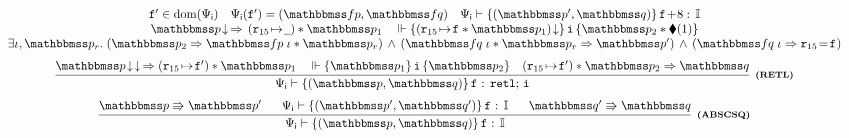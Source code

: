 \begin{figure*}
{\begin{minipage}{1\textwidth}
\[\begin{array}{c}
{                    }
                    {
                        \begin{array}{c}
                            \lab{}' \in \dom(\intSpec) \quad
                            \intSpec (\lab{}') = (\relspecpre, \relspecpost) \quad
                            \wdcblk{\intSpec}{\relastP'}
                                {\relastQ}{\lab{}\!+\!8}{\cblk} \\
                            \nxtAst{\relastP} \,\Rightarrow\,
                                (\regst{\reg{15}}{\notCare})
                                    * \relastP_1
                            \quad
                            \relwfins{\asrttm{(\regst{\reg{15}}{\lab{}} * \relastP_1)}}
                            {\simplins}{\relastP_2 \sepstar \metricAst{1}}  \\
                            \exists  \lgvl, \relastP_r. \;
                            \supimpl{\relastP_2}{\relastP'}
                                {\relspecpre \; \lgvl * \relastP_r}
                                {\relspecpost \; \lgvl * \relastP_r} \, \wedge \,
                            (\relspecpost \; \lgvl \Rightarrow \reg{15} \!=\! \lab{})
                        \end{array}	
                    } \\
                    \\[-5pt]
                    \infer[\tinybftext{(RETL)}]
                    {
                        \wdcblk{\intSpec}{\relastP}{\relastQ}{\lab{}}{\retl; \, \simplins}
                    }
                    {
                        \nxtAst{\nxtAst{\relastP}} \,\Rightarrow
                        (\regst\RAreg{\lab{}'}) \sepstar \relastP_1
                        \quad
                        \relwfins{\relastP_1}{\simplins}{\relastP_2}
                        \quad
                        (\regst\RAreg{\lab{}'}) \sepstar 
                                    \relastP_2 \Rightarrow \relastQ
                    } \\
                    \\[-5pt]
                    \infer[\tinybftext{(ABSCSQ)}]
                    {
                        \wdcblk{\intSpec}{\relastP}{\relastQ}
                            {\lab{}}{\cblk}
                    }
                    {
                        \absExec{\relastP}{\relastP'} \quad \ \ 
                        \wdcblk{\intSpec}{\relastP'}{\relastQ'}
                            {\lab{}}{\cblk} 
                        \quad \ \ 
                        \absExec{\relastQ'}{\relastQ}
                    }
                \end{array}
            \]
        \end{minipage}
    }


\end{figure*}
